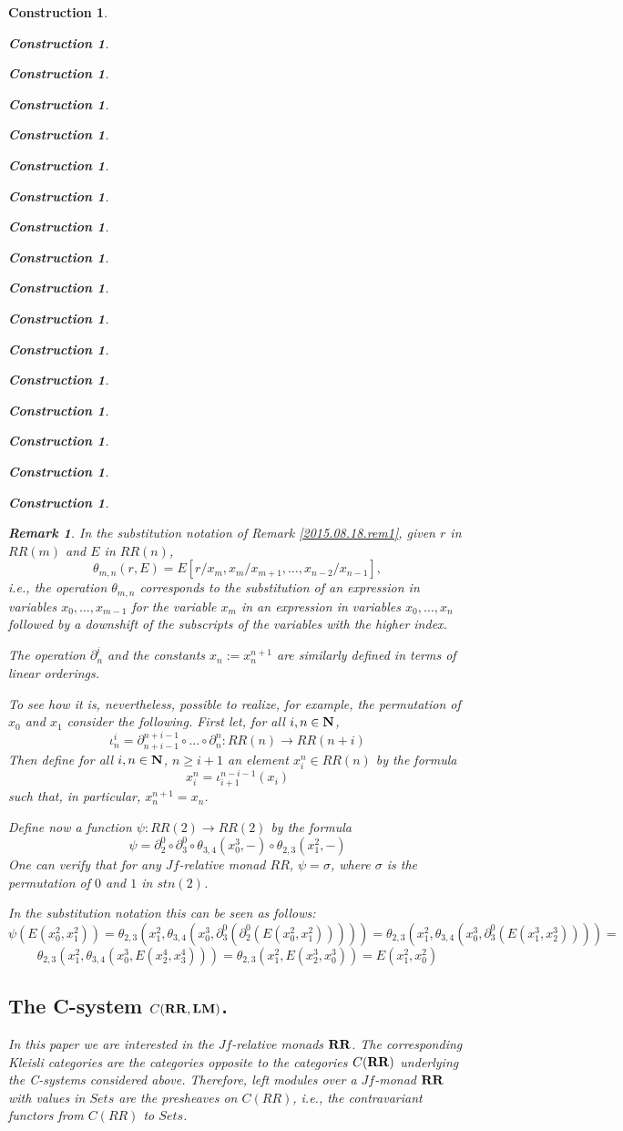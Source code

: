 \documentclass[12pt]{amsart}
\newtheorem{remark}[proposition]{Remark}
\newtheorem{construction}[proposition]{Construction}
\newcommand{\llabel}[1]{\label{#1}}
\newcommand{\sr}{\rightarrow}
\newcommand{\nn}{{\bf N\rm}}
\newcommand{\nat}{\nn}
\newcommand{\RR}{{\bf RR}}
\newcommand{\LM}{{\bf LM}}
\begin{document}
\begin{construction}
\begin{construction}
\begin{construction}
\begin{construction}
\begin{construction}
\begin{construction}
\begin{construction}
\begin{construction}
\begin{construction}
\begin{construction}
\begin{construction}
\begin{construction}
\begin{construction}
\begin{construction}
\begin{construction}
\begin{construction}
\begin{construction}
\begin{remark}
In the substitution notation of Remark \ref{2015.08.18.rem1}, given $r$ in
$RR(m)$ and $E$ in $RR(n)$,
%
$$\theta_{m,n}(r,E)=E[r/x_m,x_m/x_{m+1},\dots,x_{n-2}/x_{n-1}],$$
%
i.e., the operation $\theta_{m,n}$ corresponds to the substitution of an
expression in variables $x_0,\dots,x_{m-1}$ for the variable $x_m$ in an
expression in variables $x_0,\dots,x_n$ followed by a downshift of the subscripts
of the variables with the higher index.

The operation $\partial_n^i$ and the constants $x_n:=x^{n+1}_{n}$ are similarly
defined in terms of linear orderings.

To see how it is, nevertheless, possible to realize, for example, the
permutation of $x_0$ and $x_1$ consider the following. First let, for all
$i,n\in\nat$,
%
$$\iota_n^i=\partial_{n+i-1}^{n+i-1}\circ \dots\circ \partial_n^n:RR(n)\sr RR(n+i)$$
%
Then define for all $i,n\in\nat$, $n\ge i+1$ an element $x^n_i\in RR(n)$ by the formula
%
$$x^n_i=\iota_{i+1}^{n-i-1}(x_i)$$
%
such that, in particular, $x^{n+1}_{n}=x_n$.

Define now a function $\psi:RR(2)\sr RR(2)$ by the formula
%
$$\psi=\partial^0_2\circ \partial^0_3\circ \theta_{3,4}(x_0^3,-)\circ \theta_{2,3}(x_1^2,-)$$
%
One can verify that for any $Jf$-relative monad $RR$, $\psi=\sigma$, where
$\sigma$ is the permutation of $0$ and $1$ in $stn(2)$.

In the substitution notation this can be seen as follows:
%
$$\psi(E(x^2_0,x_1^2))=\theta_{2,3}(x_1^2,\theta_{3,4}(x_0^3,\partial^0_3(\partial^0_2(E(x^2_0,x_1^2)))))=\theta_{2,3}(x_1^2,\theta_{3,4}(x_0^3,\partial^0_3(E(x^3_1,x^3_2))))=$$
$$\theta_{2,3}(x_1^2,\theta_{3,4}(x_0^3,E(x^4_2,x^4_3)))=\theta_{2,3}(x_1^2,E(x^3_2,x^3_0))=E(x^2_1,x^2_0)$$
%
\end{remark}
%

\subsection{The C-system $C(\RR,\LM)$.}
%
\llabel{CRRLM}

In this paper we are interested in the $Jf$-relative monads $\RR$. The
corresponding Kleisli categories are the categories opposite to the categories
$C(\RR)$ underlying the C-systems considered above. Therefore, left modules
over a $Jf$-monad $\RR$ with values in $Sets$ are the presheaves on $C(RR)$,
i.e., the contravariant functors from $C(RR)$ to $Sets$.


\end{construction}
\end{construction}
\end{construction}
\end{construction}
\end{construction}
\end{construction}
\end{construction}
\end{construction}
\end{construction}
\end{construction}
\end{construction}
\end{construction}
\end{construction}
\end{construction}
\end{construction}
\end{construction}
\end{construction}
\end{document}

